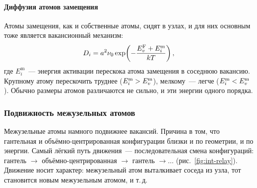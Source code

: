 \paragraph{Диффузия атомов замещения}
Атомы замещения, как и собственные атомы, сидят в узлах, и для них
основным тоже является вакансионный механизм:
\begin{equation}\label{eq:Di}
D_i=a^2\nu_0\exp\!\left(-\frac{E_{v}^{\mathrm{F}}+E_i^{\mathrm m}}{kT}\right),
\end{equation}
где $E_i^{\mathrm m}$~— энергия активации перескока атома замещения в
соседнюю вакансию. Крупному атому
перескочить труднее ($E_i^{\mathrm m}>E_{v}^{\mathrm{m}}$), мелкому~— легче
($E_i^{\mathrm m}<E_{v}^{\mathrm{m}}$). Обычно размеры атомов различаются не сильно, и
эти энергии одного порядка.

\subsubsection{Подвижность межузельных атомов}\label{par:int-mobility}

Межузельные атомы намного подвижнее вакансий. Причина в том, что
гантельная и объёмно-центрированная конфигурации близки и по геометрии,
и по энергии. Самый лёгкий путь движения~— последовательная смена
конфигураций: гантель $\to$ объёмно-центрированная $\to$ гантель $\to\dots$
(рис.~\ref{fig:int-relay}). Движение носит  характер:
межузельный атом выталкивает соседа из узла, тот становится новым
межузельным атомом, и т.\,д.

